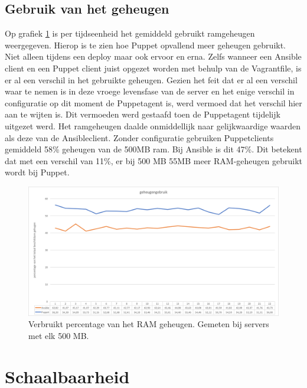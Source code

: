 \subsection{Gebruik van het geheugen}

Op grafiek \ref{fig:geheugengebruik} is per tijdseenheid het gemiddeld gebruikt ramgeheugen weergegeven. Hierop is te zien hoe Puppet opvallend meer geheugen gebruikt. Niet alleen tijdens een deploy maar ook ervoor en erna. Zelfs wanneer een Ansible client en een Puppet client juist opgezet worden met behulp van de Vagrantfile, is er al een verschil in het gebruikte geheugen. Gezien het feit dat er al een verschil waar te nemen is in deze vroege levensfase van de server en het enige verschil in configuratie op dit moment de Puppetagent is, werd vermoed dat het verschil hier aan te wijten is. Dit vermoeden werd gestaafd toen de Puppetagent tijdelijk uitgezet werd. Het ramgeheugen daalde onmiddellijk naar gelijkwaardige waarden als deze van de Ansibleclient. Zonder configuratie gebruiken Puppetclients gemiddeld 58\% geheugen van de 500MB ram. Bij Ansible is dit 47\%. Dit betekent dat met een verschil van 11\%, er bij 500 MB 55MB meer RAM-geheugen gebruikt wordt bij Puppet.


\begin{figure}
  \includegraphics[width=\linewidth]{img/geheugengebruik}
 \caption{Verbruikt percentage van het RAM geheugen. Gemeten bij servers met elk 500 MB. }  
  \label{fig:geheugengebruik}
\end{figure}


\section{Schaalbaarheid}
\label{sec:schaalbaarheid}


